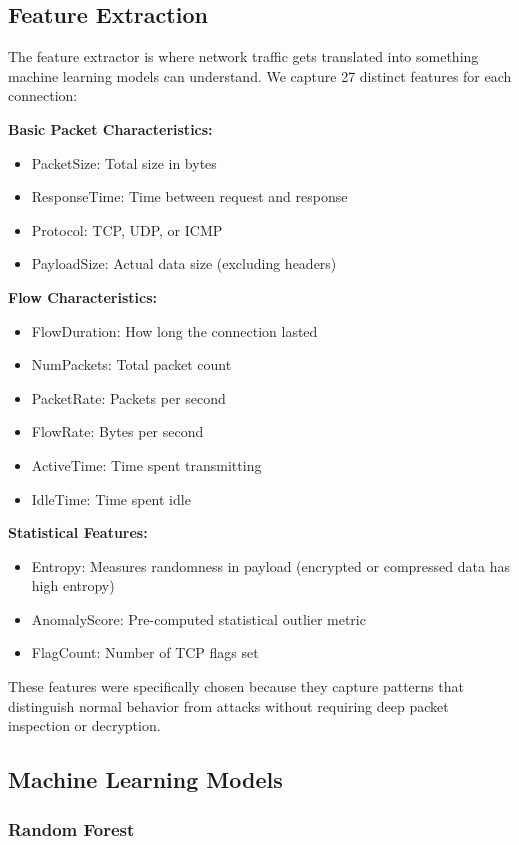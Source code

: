 \documentclass[conference]{IEEEtran}
\begin{document}
\subsection{Feature Extraction}

The feature extractor is where network traffic gets translated into something machine learning models can understand. We capture 27 distinct features for each connection:

\textbf{Basic Packet Characteristics:}
\begin{itemize}
\item PacketSize: Total size in bytes
\item ResponseTime: Time between request and response
\item Protocol: TCP, UDP, or ICMP
\item PayloadSize: Actual data size (excluding headers)
\end{itemize}

\textbf{Flow Characteristics:}
\begin{itemize}
\item FlowDuration: How long the connection lasted
\item NumPackets: Total packet count
\item PacketRate: Packets per second
\item FlowRate: Bytes per second
\item ActiveTime: Time spent transmitting
\item IdleTime: Time spent idle
\end{itemize}

\textbf{Statistical Features:}
\begin{itemize}
\item Entropy: Measures randomness in payload (encrypted or compressed data has high entropy)
\item AnomalyScore: Pre-computed statistical outlier metric
\item FlagCount: Number of TCP flags set
\end{itemize}

These features were specifically chosen because they capture patterns that distinguish normal behavior from attacks without requiring deep packet inspection or decryption.

\subsection{Machine Learning Models}

\subsubsection{Random Forest}
\end{document}
